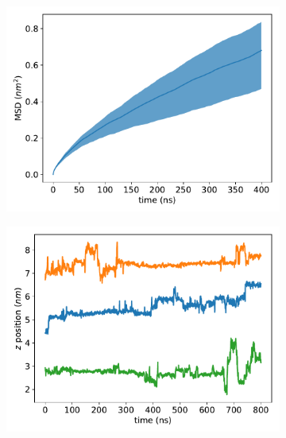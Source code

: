 \documentclass{article}
\begin{document}

  \begin{figure}
  \centering
  \begin{subfigure}{0.49\textwidth}
  \includegraphics[width=\linewidth]{example_msd.pdf}
  \caption{}\label{fig:example_msd}
  \end{subfigure}
  \begin{subfigure}{0.49\textwidth}
  \includegraphics[width=\linewidth]{example_ztraces.pdf}

\end{subfigure}
\end{figure}
\end{document}
